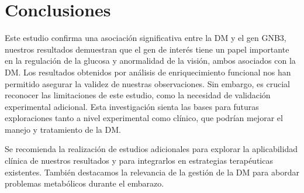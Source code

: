 \section{Conclusiones}

Este estudio confirma una asociación significativa entre la DM y el gen GNB3, nuestros resultados demuestran que el gen de interés tiene un papel importante en la regulación de la glucosa y anormalidad de la visión, ambos asociados con la DM. Los resultados obtenidos por análisis de enriquecimiento funcional nos han permitido asegurar la validez de nuestras observaciones. Sin embargo, es crucial reconocer las limitaciones de este estudio, como la necesidad de validación experimental adicional.
Esta investigación sienta las bases para futuras exploraciones tanto a nivel experimental como clínico, que podrían mejorar el manejo y tratamiento de la DM.

Se recomienda la realización de estudios adicionales para explorar la aplicabilidad clínica de nuestros resultados y para integrarlos en estrategias terapéuticas existentes. También destacamos la relevancia de la gestión de la DM para abordar problemas metabólicos durante el embarazo. 

